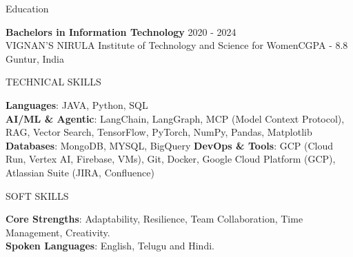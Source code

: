 \documentclass{resume} %
\begin{document}

\begin{rSection}{Education}

{\bf Bachelors in Information Technology} \hfill {2020 - 2024} \\
VIGNAN’S NIRULA Institute of Technology and Science for Women\hfill {CGPA - 8.8} \\
Guntur, India


\end{rSection}

\begin{rSection}{TECHNICAL SKILLS}

\textbf{Languages}: JAVA, Python, SQL \\
\textbf{AI/ML \& Agentic}: LangChain, LangGraph, MCP (Model Context Protocol), RAG, Vector Search, TensorFlow, PyTorch, NumPy, Pandas, Matplotlib \\
\textbf{Databases}: MongoDB, MYSQL, BigQuery
\textbf{DevOps \& Tools}: GCP (Cloud Run, Vertex AI, Firebase, VMs), Git, Docker, Google Cloud Platform (GCP), Atlassian Suite (JIRA, Confluence)

\end{rSection}

\begin{rSection}{SOFT SKILLS}

\textbf{Core Strengths}: Adaptability, Resilience, Team Collaboration, Time Management, Creativity. \\
\textbf{Spoken Languages}: English, Telugu and Hindi. \\

\end{rSection}
\end{document}
